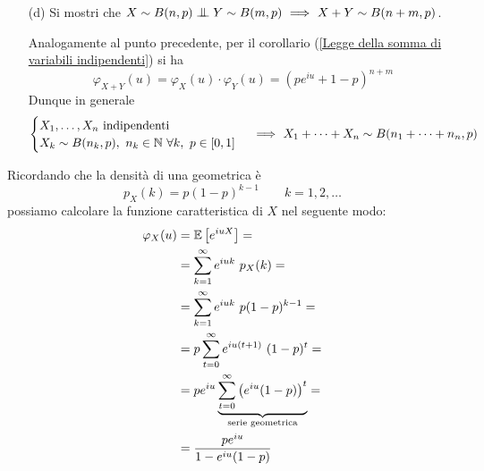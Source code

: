 \begin{enumerate}
\item [(d)] Si mostri che $X\sim B(n,p)\indep Y\sim B(m,p)\SE X+Y\sim B(n+m,p)$.

Analogamente al punto precedente, per il corollario (\ref{Legge della somma di variabili indipendenti}) si ha
\[
\varphi_{X+Y}(u)=\varphi_X(u)\cdot \varphi_Y(u)=\left(pe^{iu}+1-p\right)^{n+m}
\]
Dunque in generale
\[
\begin{cases}X_1,\dots,X_n\text{ indipendenti}\\X_k\sim B(n_k,p),\ n_k\in\NN\ \forall k,\ p\in[0,1]\end{cases} \SE X_1+\cdots+X_n\sim B(n_1+\cdots+n_n,p)
\]
\end{enumerate}

\Soluzione{} %
Ricordando che la densità di una geometrica è
\[
p_X(k)=p(1-p)^{k-1}\qquad k=1,2,\dots
\]
possiamo calcolare la funzione caratteristica di $X$ nel seguente modo:
\begin{gather*}
\begin{aligned}
\varphi_X(u)&=\mathbb{E}\left[e^{iuX}  \right]=\\
&=\sum_{k=1}^\infty e^{iuk}\ p_X(k)=\\
&=\sum_{k=1}^\infty e^{iuk}\ p(1-p)^{k-1}=\\
&=p\sum_{t=0}^\infty e^{iu(t+1)}\ (1-p)^{t}=\\
&=pe^{iu}\underbrace{\sum_{t=0}^\infty\left(e^{iu}(1-p)   \right)^t}_{\text{serie geometrica}}=\\
&=\frac{pe^{iu}}{1-e^{iu}(1-p)}
\end{aligned}
\end{gather*}

